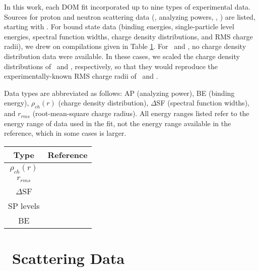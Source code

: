 In this work, each DOM fit incorporated up to nine types of experimental data. Sources for proton
and neutron scattering data (\el, analyzing powers, \rxn, \tot) are listed, starting with \oSix.
For bound state data (binding energies, single-particle level energies, spectral function widths,
charge density distributions, and RMS charge radii), we drew on compilations given in Table
\ref{BoundStateData}. For \oEight\ and \snTwelve, no charge density distribution data were
available. In these cases, we scaled the charge density distributions of \oSix\ and \snFour,
respectively, so that they would reproduce the experimentally-known RMS charge radii of
\oEight\ and \snTwelve.

Data types are abbreviated as follows: AP (analyzing power), BE (binding energy),
$\rho_{ch}(r)$ (charge density distribution), $\Delta$SF (spectral function widths), and
$r_{rms}$ (root-mean-square charge radius). All energy ranges listed refer to the energy range of 
data used in the fit, not the energy range available in the reference, which in some cases is larger.
\\
\begin{table}[htp]
    \label{BoundStateData}
    \centering
    \begin{tabular}{c  c} 
        \toprule
        \bf{Type} & \bf{Reference} \\
        \midrule
        $\rho_{ch}(r)$ & \cite{DeVries1987}\\
        $r_{rms}$ & \cite{DeVries1987}\\
        $\Delta$SF & \cite{Jacob1966, Jacob1973}\\
        SP levels & \cite{AME2016}\\
        BE & \cite{AME2016}\\
        \bottomrule
    \end{tabular}
\end{table}

\pagebreak
\section{\oSix\ Scattering Data}

\begin{table}[htp]
    \small
    \hspace*{\fill}%
    \begin{minipage}[t]{0.47\linewidth}
        \centering
        \vspace{0pt}
        
    \end{minipage}%
    \hfill
    \begin{minipage}[t]{0.47\linewidth}
        \centering
        \vspace{0pt}
        
    \end{minipage}
    \hspace*{\fill}
\end{table}

